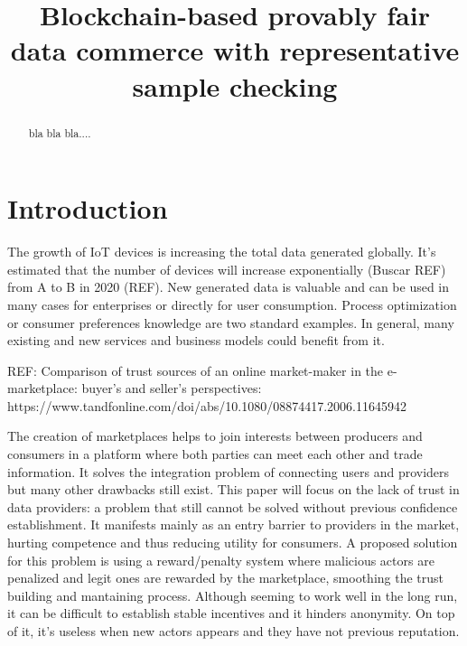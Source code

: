 \documentclass[]{article}
\title{Blockchain-based provably fair data commerce with representative sample checking}
\author{}
\begin{document}
\maketitle

\begin{abstract}
bla bla bla....
\end{abstract}

\section{Introduction}
The growth of IoT devices is increasing the total data generated globally. It's estimated that the number of devices will increase exponentially (Buscar REF) from A to B in 2020 (REF). New generated data is valuable and can be used in many cases for enterprises or directly for user consumption. Process optimization or consumer preferences knowledge are two standard examples. In general, many existing and new services and business models could benefit from it. 

REF: Comparison of trust sources of an online market-maker in the e-marketplace: buyer's and seller's perspectives: https://www.tandfonline.com/doi/abs/10.1080/08874417.2006.11645942

The creation of marketplaces helps to join interests between producers and consumers in a platform where both parties can meet each other and trade information. It solves the integration problem of connecting users and providers but many other drawbacks still exist. This paper will focus on the lack of trust in data providers: a problem that still cannot be solved without previous confidence establishment. It manifests mainly as an entry barrier to providers in the market, hurting competence and thus reducing utility for consumers.
A proposed solution for this problem is using a reward/penalty system where malicious actors are penalized and legit ones are rewarded by the marketplace, smoothing the trust building and mantaining process. Although seeming to work well in the long run, it can be difficult to establish stable incentives and it hinders anonymity. On top of it, it's useless when new actors appears and they have not previous reputation.

\end{document}
